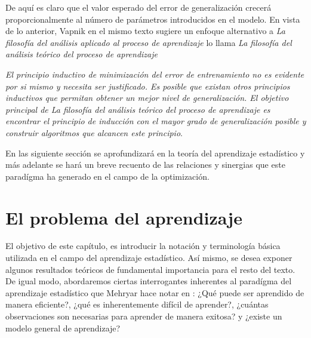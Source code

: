 \documentclass{book}
\theoremstyle{plain}
\theoremstyle{definition}
\theoremstyle{remark}
\begin{document}
De aquí es claro que el valor esperado del error de generalización crecerá proporcionalmente al número de parámetros introducidos en el modelo. En vista de lo anterior, Vapnik en el mismo texto sugiere un enfoque alternativo a \emph{La filosofía del análisis aplicado al proceso de aprendizaje} lo llama \emph{La filosofía del análisis teórico del proceso de aprendizaje}


\begin{changemargin}{1.5cm}{1.5cm}
\emph{El principio inductivo de minimización del error de entrenamiento no es evidente por si mismo y necesita ser justificado. Es posible que existan otros principios inductivos que permitan obtener un mejor nivel de generalización. El objetivo principal de La filosofía del análisis teórico del proceso de aprendizaje es encontrar el principio de inducción con el mayor grado de generalización posible y construir algoritmos que alcancen este principio}.
\end{changemargin}


En las siguiente sección se aprofundizará en la teoría del aprendizaje estadístico y más adelante se hará un breve recuento de las relaciones y sinergias que este paradígma ha generado en el campo de la optimización. 



\newpage

\section{El problema del aprendizaje}


El objetivo de este capítulo, es introducir la notación y terminología básica utilizada en el campo del aprendizaje estadístico. Así mismo, se desea exponer algunos resultados teóricos de fundamental importancia para el resto del texto. De igual modo, abordaremos ciertas interrogantes inherentes al paradígma del aprendizaje estadístico que Mehryar hace notar en \cite{Mehryar}: ¿Qué puede ser aprendido de manera eficiente?, ¿qué es inherentemente difícil de aprender?, ¿cuántas observaciones son necesarias para aprender de manera exitosa? y ¿existe un modelo general de aprendizaje?
\end{document}
